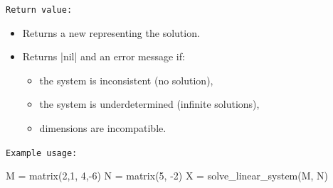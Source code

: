 \medskip
\texttt{Return value: }

\begin{itemize}
\item Returns a new  representing the solution.
\item Returns |nil| and an error message if:
\begin{itemize}
\item the system is inconsistent (no solution),
\item the system is underdetermined (infinite solutions),
\item dimensions are incompatible.
\end{itemize}
\end{itemize}

\texttt{Example usage: }

\begin{tkzexample}
M = matrix({{2,1}, {4,-6}})
N = matrix({{5}, {-2}})
X = solve_linear_system(M, N)
\end{tkzexample}
\endinput
